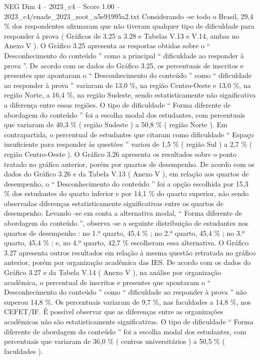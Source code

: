 \begin{textsample}{NEG Dim 4 – 2023\_c4 – Score 1.00 – 2023\_c4/enade\_2023\_zoot\_a5e91995a2.txt}
Considerando -se todo o Brasil, 29,4 \% dos respondentes afirmaram que não tiveram qualquer tipo de dificuldade para responder à prova ( Gráficos de 3.25 a 3.28 e Tabelas V.13 e V.14, ambas no Anexo V ).
O Gráfico 3.25 apresenta as respostas obtidas sobre o “ Desconhecimento do conteúdo ” como a principal “ dificuldade ao responder à prova ”.
De acordo com os dados do Gráfico 3.25, os percentuais de inscritos e presentes que apontaram o “ Desconhecimento do conteúdo ” como “ dificuldade ao responder à prova ” variaram de 13,0 \%, na região Centro-Oeste e 13,0 \%, na região Norte, a 16,4 \%, na região Sudeste, sendo estatisticamente não significativa a diferença entre essas regiões.
O tipo de dificuldade “ Forma diferente de abordagem do conteúdo ” foi a escolha modal dos estudantes, com percentuais que variaram de 40,3 \% ( região Sudeste ) a 50,8 \% ( região Norte ).
Em contrapartida, o percentual de estudantes que citaram como dificuldade “ Espaço insuficiente para responder às questões ” variou de 1,5 \% ( região Sul ) a 2,7 \% ( região Centro-Oeste ).
O Gráfico 3.26 apresenta os resultados sobre o ponto tratado no gráfico anterior, porém por quartos de desempenho.
De acordo com os dados do Gráfico 3.26 e da Tabela V.13 ( Anexo V ), em relação aos quartos de desempenho, o “ Desconhecimento do conteúdo ” foi a opção escolhida por 15,3 \% dos estudantes do quarto inferior e por 14,1 \% do quarto superior, não sendo observadas diferenças estatisticamente significativas entre os quartos de desempenho.
Levando -se em conta a alternativa modal, “ Forma diferente de abordagem do conteúdo ”, observa -se a seguinte distribuição de estudantes nos quartos de desempenho : no 1.º quarto, 45,4 \% ; no 2.º quarto, 45,4 \% ; no 3.º quarto, 45,4 \% ; e, no 4.º quarto, 42,7 \% escolheram essa alternativa.
O Gráfico 3.27 apresenta outros resultados em relação à mesma questão retratada no gráfico anterior, porém por organização acadêmica das IES.
De acordo com os dados do Gráfico 3.27 e da Tabela V.14 ( Anexo V ), na análise por organização acadêmica, o percentual de inscritos e presentes que apontaram o “ Desconhecimento do conteúdo ” como “ dificuldade ao responder à prova ” não superou 14,8 \%.
Os percentuais variaram de 9,7 \%, nas faculdades a 14,8 \%, nos CEFET/IF.
É possível observar que as diferenças entre as organizações acadêmicas não são estatisticamente significativas.
O tipo de dificuldade “ Forma diferente de abordagem do conteúdo ” foi a escolha modal dos estudantes, com percentuais que variaram de 36,0 \% ( centros universitários ) a 50,5 \% ( faculdades ).

\end{textsample}
